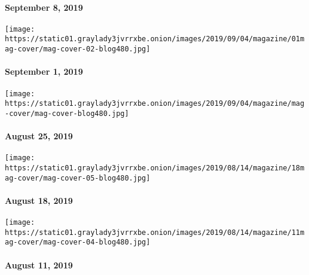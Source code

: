 \hypertarget{september-8-2019}{%
\paragraph{September 8, 2019}\label{september-8-2019}}

\href{https://www.nytimes3xbfgragh.onion/issue/magazine/2019/09/04/the-90119-issue}{}

\texttt{[image: https://static01.graylady3jvrrxbe.onion/images/2019/09/04/magazine/01mag-cover/mag-cover-02-blog480.jpg]}

\hypertarget{september-1-2019}{%
\paragraph{September 1, 2019}\label{september-1-2019}}

\href{https://www.nytimes3xbfgragh.onion/issue/magazine/2019/09/04/the-82519-issue}{}

\texttt{[image: https://static01.graylady3jvrrxbe.onion/images/2019/09/04/magazine/mag-cover/mag-cover-blog480.jpg]}

\hypertarget{august-25-2019}{%
\paragraph{August 25, 2019}\label{august-25-2019}}

\href{https://www.nytimes3xbfgragh.onion/interactive/2019/08/14/magazine/1619-america-slavery.html}{}

\texttt{[image: https://static01.graylady3jvrrxbe.onion/images/2019/08/14/magazine/18mag-cover/mag-cover-05-blog480.jpg]}

\hypertarget{august-18-2019}{%
\paragraph{August 18, 2019}\label{august-18-2019}}

\href{https://www.nytimes3xbfgragh.onion/issue/magazine/2019/08/14/the-81119-issue}{}

\texttt{[image: https://static01.graylady3jvrrxbe.onion/images/2019/08/14/magazine/11mag-cover/mag-cover-04-blog480.jpg]}

\hypertarget{august-11-2019}{%
\paragraph{August 11, 2019}\label{august-11-2019}}

\href{https://www.nytimes3xbfgragh.onion/issue/magazine/2019/08/14/the-8419-issue}{}

